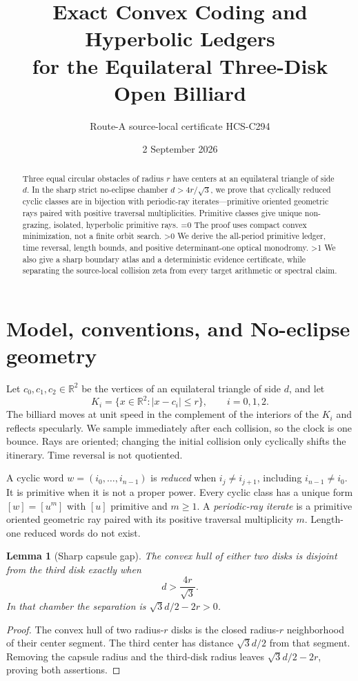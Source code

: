 \documentclass[10pt]{article}
\title{Exact Convex Coding and Hyperbolic Ledgers\\
for the Equilateral Three-Disk Open Billiard}
\author{Route-A source-local certificate HCS-C294}
\date{2 September 2026}
\providecommand{\CRevisionRound}{2}
\newtheorem{lemma}{Lemma}
\newcommand{\R}{\mathbb R}
\begin{document}
\maketitle

\begin{abstract}
Three equal circular obstacles of radius $r$ have centers at an equilateral
triangle of side $d$.  In the sharp strict no-eclipse chamber
$d>4r/\sqrt3$, we prove that cyclically reduced cyclic classes are in
bijection with periodic-ray iterates---primitive oriented geometric rays
paired with positive traversal multiplicities.  Primitive classes give
unique non-grazing, isolated, hyperbolic primitive rays.
\ifnum\CRevisionRound=0
The proof uses compact convex minimization, not a finite orbit search.
\fi
\ifnum\CRevisionRound>0
We derive the all-period primitive ledger, time reversal, length bounds, and
positive determinant-one optical monodromy.
\fi
\ifnum\CRevisionRound>1
We also give a sharp boundary atlas and a deterministic evidence certificate,
while separating the source-local collision zeta from every target arithmetic
or spectral claim.
\fi
\end{abstract}

\section{Model, conventions, and No-eclipse geometry}
Let $c_0,c_1,c_2\in\R^2$ be the vertices of an equilateral triangle of side
$d$, and let
\[
 K_i=\{x\in\R^2:|x-c_i|\le r\},\qquad i=0,1,2.
\]
The billiard moves at unit speed in the complement of the interiors of the
$K_i$ and reflects specularly.  We sample immediately after each collision,
so the clock is one bounce.  Rays are oriented; changing the initial collision
only cyclically shifts the itinerary.  Time reversal is not quotiented.

A cyclic word $w=(i_0,\ldots,i_{n-1})$ is \emph{reduced} when
$i_j\ne i_{j+1}$, including $i_{n-1}\ne i_0$.  It is primitive when it is not
a proper power.  Every cyclic class has a unique form $[w]=[u^m]$ with
$[u]$ primitive and $m\ge1$.  A \emph{periodic-ray iterate} is a primitive
oriented geometric ray paired with its positive traversal multiplicity $m$.
Length-one reduced words do not exist.

\begin{lemma}[Sharp capsule gap]\label{lem:gap}
The convex hull of either two disks is disjoint from the third disk exactly
when
\[
 d>\frac{4r}{\sqrt3}.
\]
In that chamber the separation is $\sqrt3d/2-2r>0$.
\end{lemma}
\begin{proof}
The convex hull of two radius-$r$ disks is the closed radius-$r$ neighborhood
of their center segment.  The third center has distance $\sqrt3d/2$ from
that segment.  Removing the capsule radius and the third-disk radius leaves
$\sqrt3d/2-2r$, proving both assertions.
\end{proof}
\end{document}
